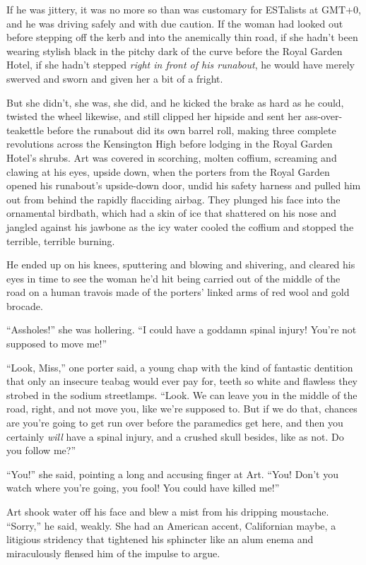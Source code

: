 If he was jittery, it was no more so than was customary for
ESTalists at GMT+0, and he was driving safely and with due caution.
If the woman had looked out before stepping off the kerb and into
the anemically thin road, if she hadn’t been wearing stylish black
in the pitchy dark of the curve before the Royal Garden Hotel, if
she hadn’t stepped \emph{right in front of his runabout}, he would
have merely swerved and sworn and given her a bit of a fright.

But she didn’t, she was, she did, and he kicked the brake as hard
as he could, twisted the wheel likewise, and still clipped her
hipside and sent her ass-over-teakettle before the runabout did its
own barrel roll, making three complete revolutions across the
Kensington High before lodging in the Royal Garden Hotel’s shrubs.
Art was covered in scorching, molten coffium, screaming and clawing
at his eyes, upside down, when the porters from the Royal Garden
opened his runabout’s upside-down door, undid his safety harness
and pulled him out from behind the rapidly flacciding airbag. They
plunged his face into the ornamental birdbath, which had a skin of
ice that shattered on his nose and jangled against his jawbone as
the icy water cooled the coffium and stopped the terrible, terrible
burning.

He ended up on his knees, sputtering and blowing and shivering, and
cleared his eyes in time to see the woman he’d hit being carried
out of the middle of the road on a human travois made of the
porters’ linked arms of red wool and gold brocade.

“Assholes!” she was hollering. “I could have a goddamn spinal
injury! You’re not supposed to move me!”

“Look, Miss,” one porter said, a young chap with the kind of
fantastic dentition that only an insecure teabag would ever pay
for, teeth so white and flawless they strobed in the sodium
streetlamps. “Look. We can leave you in the middle of the road,
right, and not move you, like we’re supposed to. But if we do that,
chances are you’re going to get run over before the paramedics get
here, and then you certainly \emph{will} have a spinal injury, and
a crushed skull besides, like as not. Do you follow me?”

“You!” she said, pointing a long and accusing finger at Art. “You!
Don’t you watch where you’re going, you fool! You could have killed
me!”

Art shook water off his face and blew a mist from his dripping
moustache. “Sorry,” he said, weakly. She had an American accent,
Californian maybe, a litigious stridency that tightened his
sphincter like an alum enema and miraculously flensed him of the
impulse to argue.

